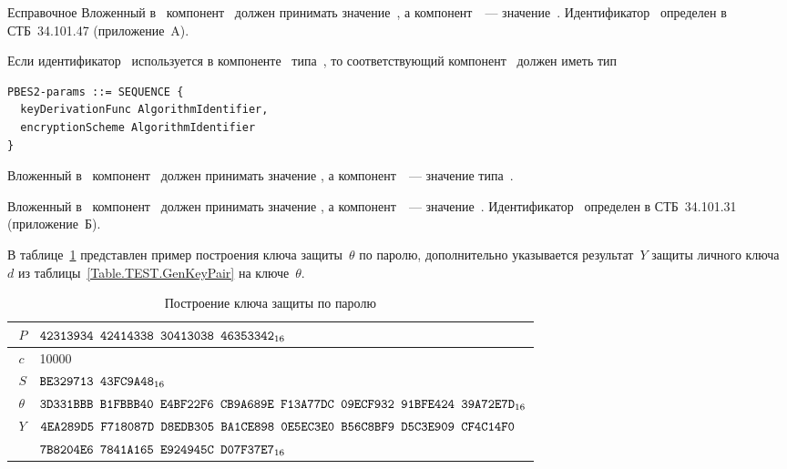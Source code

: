 \begin{appendix}{Е}{справочное}
Вложенный в~ компонент~
должен принимать значение~,
а компонент~~--- значение~.
%
Идентификатор~ 
определен в СТБ~34.101.47 (приложение~A).

Если идентификатор~ используется в
компоненте~ типа~,
то соответствующий компонент~ должен иметь тип
\begin{verbatim}
PBES2-params ::= SEQUENCE {
  keyDerivationFunc AlgorithmIdentifier,
  encryptionScheme AlgorithmIdentifier
}
\end{verbatim}

Вложенный в~ компонент~
должен принимать значение ,
а компонент~~--- значение типа~.

Вложенный в~ компонент~
должен принимать значение ,
а компонент~~--- значение~.
%
Идентификатор~ 
определен в СТБ~34.101.31 (приложение~Б).

\label{PASSWORD.Test}

В таблице~\ref{Table.PASSWORD.TestPBKDF} представлен пример 
построения ключа защиты~$\theta$ по паролю,
дополнительно указывается 
результат~$Y$ защиты личного ключа~$d$ из таблицы~\ref{Table.TEST.GenKeyPair}
на ключе~$\theta$.

\begin{table}[H]
\caption{Построение ключа защиты по паролю}\label{Table.PASSWORD.TestPBKDF}
{\small
\begin{tabular}{|l|l|}
\hline
$\phantom{\langle}P$ & 
$\texttt{42313934~42414338~30413038~46353342}_{16}$\\
% 
%
\hline
$\phantom{\langle}c$ & 
10000\\
%
\hline
$\phantom{\langle}S$ & 
$\texttt{BE329713~43FC9A48}_{16}$\\
%
\hline
\hline
$\phantom{\langle}\theta$ & 
$\texttt{3D331BBB~B1FBBB40~E4BF22F6~CB9A689E~F13A77DC~09ECF932~91BFE424~39A72E7D}_{16}$\\
\hline
\hline
$\phantom{\langle}Y$ &
$\texttt{4EA289D5~F718087D~D8EDB305~BA1CE898~0E5EC3E0~B56C8BF9~D5C3E909~CF4C14F0}$\\
&
$\texttt{7B8204E6~7841A165~E924945C~D07F37E7}_{16}$\\
\hline
\end{tabular}
}
\end{table}

\end{appendix}

